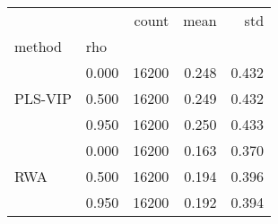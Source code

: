 \begin{small}
\begin{ttfamily}
\begin{tabular}{llrrr}
\toprule
 &  & count & mean & std \\
method & rho &  &  &  \\
\midrule
\multirow[t]{3}{*}{PLS-VIP} & 0.000 & 16200 & 0.248 & 0.432 \\
 & 0.500 & 16200 & 0.249 & 0.432 \\
 & 0.950 & 16200 & 0.250 & 0.433 \\
\cline{1-5}
\multirow[t]{3}{*}{RWA} & 0.000 & 16200 & 0.163 & 0.370 \\
 & 0.500 & 16200 & 0.194 & 0.396 \\
 & 0.950 & 16200 & 0.192 & 0.394 \\
\cline{1-5}
\bottomrule
\end{tabular}
\end{ttfamily}
\end{small}
